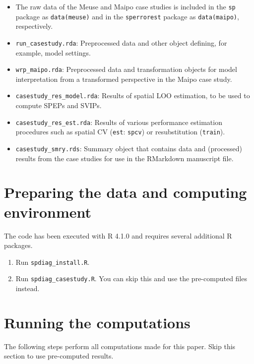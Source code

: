 \documentclass[
]{article}
\providecommand{\tightlist}{%
  \setlength{\itemsep}{0pt}\setlength{\parskip}{0pt}}
\begin{document}
\begin{itemize}
\tightlist
\item
  The raw data of the Meuse and Maipo case studies is included in the \texttt{sp} package as \texttt{data(meuse)} and in the \texttt{sperrorest} package as \texttt{data(maipo)}, respectively.
\item
  \texttt{run\_casestudy.rda}: Preprocessed data and other object defining, for example, model settings.
\item
  \texttt{wrp\_maipo.rda}: Preprocessed data and transformation objects for model interpretation from a transformed perspective in the Maipo case study.
\item
  \texttt{casestudy\_res\_model.rda}: Results of spatial LOO estimation, to be used to compute SPEPs and SVIPs.
\item
  \texttt{casestudy\_res\_est.rda}: Results of various performance estimation procedures such as spatial CV (\texttt{est}: \texttt{spcv}) or resubstitution (\texttt{train}).
\item
  \texttt{casestudy\_smry.rds}: Summary object that contains data and (processed) results from the case studies for use in the RMarkdown manuscript file.
\end{itemize}

\hypertarget{preparing-the-data-and-computing-environment}{%
\section{Preparing the data and computing environment}\label{preparing-the-data-and-computing-environment}}

The code has been executed with R 4.1.0 and requires several additional R packages.

\begin{enumerate}
\def\labelenumi{\arabic{enumi}.}
\tightlist
\item
  Run \texttt{spdiag\_install.R}.
\item
  Run \texttt{spdiag\_casestudy.R}. You can skip this and use the pre-computed files instead.
\end{enumerate}

\hypertarget{running-the-computations}{%
\section{Running the computations}\label{running-the-computations}}

The following steps perform all computations made for this paper. Skip this section to use pre-computed results.
\end{document}
